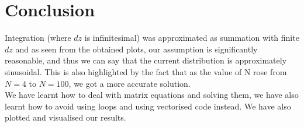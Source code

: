 \documentclass[11pt, a4paper]{article}
\begin{document}
\section{Conclusion}
Integration (where $dz$ is infinitesimal) was approximated as summation with finite $dz$ and as seen from the obtained plots, our assumption is significantly reasonable, and thus we can say that the current distribution is approximately sinusoidal. This is also highlighted by the fact that as the value of N rose from $N=4$ to $N=100$, we got a more accurate solution.\\ We have learnt how to deal with matrix equations and solving them, we have also learnt how to avoid using loops and using vectorised code instead. We have also plotted and visualised our results.
\end{document}
